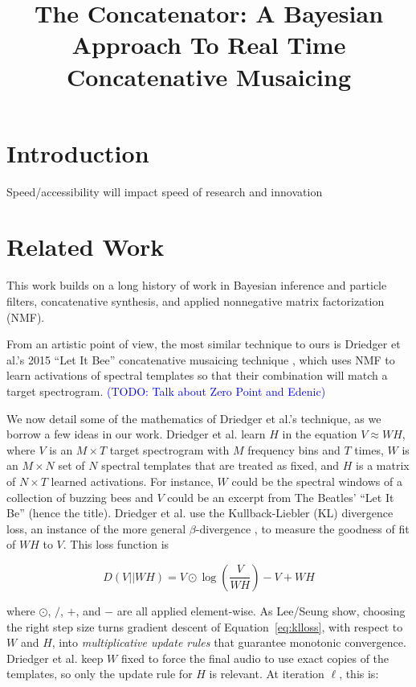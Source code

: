 \documentclass{article}
\title{The Concatenator: A Bayesian Approach To Real Time Concatenative Musaicing}
\newcommand{\BenEdit}[1]{\textcolor{blue}{(#1)}}
\begin{document}
%
\maketitle
%

\begin{abstract}

\end{abstract}

\section{Introduction}

Speed/accessibility will impact speed of research and innovation

\section{Related Work}
This work builds on a long history of work in Bayesian inference and particle filters, concatenative synthesis, and applied nonnegative matrix factorization (NMF).

From an artistic point of view, the most similar technique to ours is Driedger et al.'s 2015 ``Let It Bee'' concatenative musaicing technique \cite{driedger2015let}, which uses NMF to learn activations of spectral templates so that their combination will match a target spectrogram.
\BenEdit{TODO: Talk about Zero Point and Edenic}


We now detail some of the mathematics of Driedger et al.'s technique, as we borrow a few ideas in our work.  Driedger et al. learn $H$ in the equation $V \approx WH$, where $V$ is an $M \times T$ target spectrogram with $M$ frequency bins and $T$ times, $W$ is an $M \times N$ set of $N$ spectral templates that are treated as fixed, and $H$ is a matrix of $N \times T$ learned activations.  For instance, $W$ could be the spectral windows of a collection of buzzing bees and $V$ could be an excerpt from The Beatles' ``Let It Be'' (hence the title).  Driedger et al. use the Kullback-Liebler (KL) divergence loss, an instance of the more general $\beta$-divergence \cite{buch2017nichtnegativematrixfaktorisierungnutzendesklangsynthesensystem}, to measure the goodness of fit of $WH$ to $V$.  This loss function is 

\begin{equation}
\label{eq:klloss}
D(V || WH) = V \odot \log \left( \frac{V}{WH} \right) - V + WH
\end{equation}

where $\odot$, $/$, $+$, and $-$ are all applied element-wise.  As Lee/Seung show, choosing the right step size turns gradient descent of Equation~\ref{eq:klloss}, with respect to $W$ and $H$, into {\em multiplicative update rules} that guarantee monotonic convergence.  Driedger et al. keep $W$ fixed to force the final audio to use exact copies of the templates, so only the update rule for $H$ is relevant.  At iteration $\ell$, this is:
\end{document}
